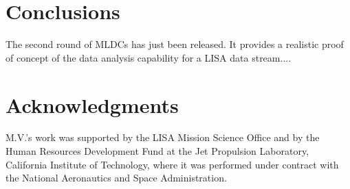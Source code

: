 \documentclass[12pt]{iopart}
\begin{document}
\section{Conclusions}

The second round of MLDCs has just been released. It provides a realistic proof of concept of the data analysis capability for a LISA data stream....


\section*{Acknowledgments}
M.V.'s work was supported by the LISA Mission Science Office and by the Human Resources Development Fund at the Jet Propulsion Laboratory, California Institute of Technology, where it was performed under contract with the National Aeronautics and Space Administration.
\end{document}
